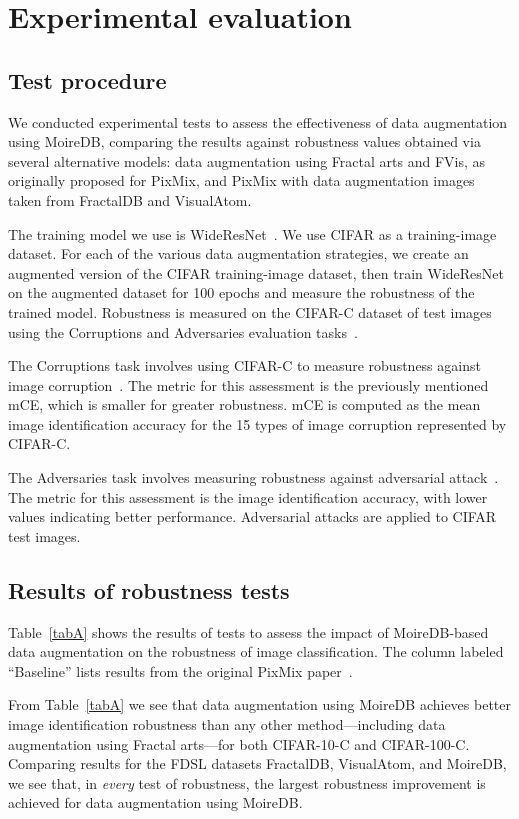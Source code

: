 \section{Experimental evaluation}
\label{sec:experimental}

\subsection{Test procedure}
\label{sec:experiment}
We conducted experimental tests to assess the effectiveness
of data augmentation using MoireDB, comparing the results
against robustness values obtained via several alternative
models: data augmentation using Fractal arts and FVis, as originally
proposed for PixMix, and PixMix with data augmentation
images taken from FractalDB and VisualAtom.

The training model we use is WideResNet~\cite{PIXMIX,WideResNet}.
We use CIFAR as a training-image dataset.
For each of the various data augmentation strategies, we create
an augmented version of the CIFAR training-image dataset,
then train WideResNet on the augmented dataset for 100 epochs
and measure the robustness of the trained model.
Robustness is measured on the CIFAR-C dataset of test images
using the Corruptions and Adversaries evaluation tasks~\cite{PIXMIX}.

The Corruptions task involves using CIFAR-C to measure
robustness against image corruption~\cite{ImageNet-C}.
The metric for this assessment is the previously mentioned mCE, which is smaller for greater robustness.
mCE is computed as the mean image identification accuracy
for the 15 types of image corruption represented by CIFAR-C.

The Adversaries task involves measuring robustness
against adversarial attack~\cite{Adrobust}.
The metric for this assessment is the image identification accuracy,
with lower values indicating better performance.
Adversarial attacks are applied to CIFAR test images.


\subsection{Results of robustness tests}
\label{sec:evaluate}

Table~\ref{tabA} shows the results of tests to assess
the impact of MoireDB-based data augmentation on
the robustness of image classification.
The column labeled ``Baseline'' lists
results from the original PixMix paper~\cite{PIXMIX}.

From Table~\ref{tabA} we see that 
data augmentation using MoireDB achieves better
image identification robustness than any other method---including
data augmentation using Fractal arts---for both CIFAR-10-C and 
CIFAR-100-C.
Comparing results for the FDSL datasets 
FractalDB, VisualAtom, and MoireDB,
we see that, in \textit{every} test of robustness,
the largest robustness improvement
is achieved for data augmentation using MoireDB.

